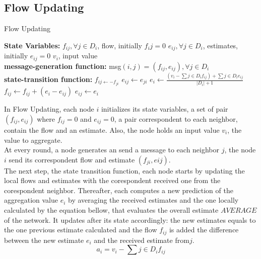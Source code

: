 \subsection{Flow Updating}
\begin{algorithm}
\caption{Flow Updating}
\begin{algorithmic}
\STATE \textbf{State Variables:}
\STATE $f_{ij}, \forall j \in D_i $, flow, initially $f_ij = 0$
\STATE $e_{ij}, \forall j \in D_i$, estimates, initially $e_{ij} = 0$
\STATE $v_{i}$, input value
\\
\STATE \textbf{message-generation function:}
\STATE msg$(i,j) = (f_{ij},e_{ij}),\forall{j}\in D_i$
\\
\STATE \textbf{state-transition function:}
\STATE $f_{ij \leftarrow -f_{ji}}$
\STATE $e_{ij} \leftarrow e_{ji}$
\ENDFOR
\STATE $e_i \leftarrow \frac{\left(v_i - \sum{j \in D_i} f_{ij}\right)+\sum{j \in D_i} e_{ij}}{|D_i|+1}$
\STATE $f_{ij} \leftarrow f_{ij} + (e_i-e_{ij})$
\STATE $e_{ij} \leftarrow e_i$
\ENDFOR
\end{algorithmic}
\end{algorithm}
In Flow Updating\cite{jesus2009fault}, each node $i$ initializes its state variables, a set of pair $(f_{ij},e_{ij})$ where $f_{ij} = 0$ and $e_{ij} = 0$, a pair correspondent to each neighbor, contain the flow and an estimate. Also, the node holds an input value $v_i$, the value to aggregate. \\
At every round, a node generates an send a message to each neighbor $j$, the node $i$ send its correspondent flow and estimate $(f_{ji},e{ij})$.\\
The next step, the state transition function, each node starts by updating the local flows and estimates with the corespondent received one from the corespondent neighbor. Thereafter, each computes a new prediction of the aggregation value $e_i$ by averaging the received estimates and the one locally calculated by the equation bellow, that evaluates the overall estimate $AVERAGE$ of the network. It updates after its state accordingly: the new estimates equals to the one previous estimate calculated and the flow $f_{ij}$ is added the difference between the new estimate $e_i$ and the received estimate from$j$.
\begin{equation*}
a_i = v_i - \sum{j \in D_i} f_{ij}
\end{equation*}

